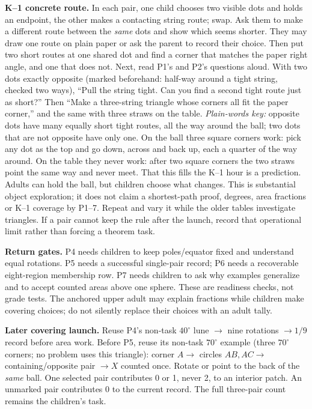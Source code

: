 \documentclass[11pt,letterpaper]{article}
\newcommand{\degc}{^\circ}
\begin{document}
\textbf{K--1 concrete route.} In each pair, one child chooses two visible dots and holds an endpoint, the other makes a contacting string route; swap. Ask them to make a different route between the \emph{same} dots and show which seems shorter. They may draw one route on plain paper or ask the parent to record their choice. Then put two short routes at one shared dot and find a corner that matches the paper right angle, and one that does not. Next, read P1's and P2's questions aloud. With two dots exactly opposite (marked beforehand: half-way around a tight string, checked two ways), ``Pull the string tight. Can you find a second tight route just as short?'' Then ``Make a three-string triangle whose corners all fit the paper corner,'' and the same with three straws on the table. \emph{Plain-words key:} opposite dots have many equally short tight routes, all the way around the ball; two dots that are not opposite have only one. On the ball three square corners work: pick any dot as the top and go down, across and back up, each a quarter of the way around. On the table they never work: after two square corners the two straws point the same way and never meet. That this fills the K--1 hour is a prediction. Adults can hold the ball, but children choose what changes. This is substantial object exploration; it does not claim a shortest-path proof, degrees, area fractions or K--1 coverage by P1--7. Repeat and vary it while the older tables investigate triangles. If a pair cannot keep the rule after the launch, record that operational limit rather than forcing a theorem task.

\textbf{Return gates.} P4 needs children to keep poles/equator fixed and understand equal rotations. P5 needs a successful single-pair record; P6 needs a recoverable eight-region membership row. P7 needs children to ask why examples generalize and to accept counted areas above one sphere. These are readiness checks, not grade tests. The anchored upper adult may explain fractions while children make covering choices; do not silently replace their choices with an adult tally.

\textbf{Later covering launch.} Reuse P4's non-task $40\degc$ lune $\to$ nine rotations $\to1/9$ record before area work. Before P5, reuse its non-task $70\degc$ example (three $70\degc$ corners; no problem uses this triangle): corner $A\to$ circles $AB,AC\to$ containing/opposite pair $\to X$ counted once. Rotate or point to the back of the \emph{same} ball. One selected pair contributes 0 or 1, never 2, to an interior patch. An unmarked pair contributes 0 to the current record. The full three-pair count remains the children's task.
\end{document}
